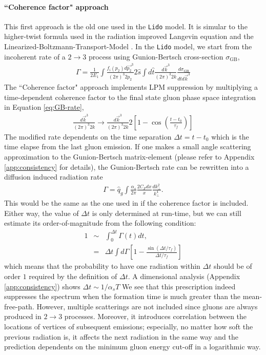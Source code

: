 \documentclass[aps, prc, reprint, amsmath, groupedaddress, nofootinbib]{revtex4-1}
\begin{document}
\paragraph*{``Coherence factor" approach} This first approach is the old one used in the {\tt Lido} model. 
It is simular to the higher-twist formula used in the radiation improved Langevin equation \cite{Cao:2013ita} and the Linearized-Boltzmann-Transport-Model \cite{Cao:2016gvr,Cao:2017hhk}.
In the {\tt Lido} model, we start from the incoherent rate of a $2\rightarrow 3$ process using Gunion-Bertsch cross-section $\sigma_\textrm{GB}$,
\begin{eqnarray}\label{eq:GB-rate}
\Gamma = \frac{1}{2E_1}\int\frac{f_i(p_2)d\vec{p_2}^3}{(2\pi)^3 2p_2}2\hat{s}\int d\hat{t}\frac{d\vec{k}^3}{(2\pi)^3 2k}\frac{d\sigma_{\textrm{GB}}}{d\hat{t}d\vec{k}^3}
\end{eqnarray}
The ``Coherence factor" approach implements LPM suppression by multiplying a time-dependent coherence factor to the final state gluon phase space integration in Equation \ref{eq:GB-rate},
\begin{eqnarray}\label{eq:GB-rate-LPM}
\frac{d\vec{k}^3}{(2\pi)^3 2k} \rightarrow \frac{d\vec{k}^3}{(2\pi)^3 2k} 2\left[1-\cos\left(\frac{t-t_0}{\tau_f}\right)\right]
\end{eqnarray}
The modified rate dependents on the time separation $\Delta t = t-t_0$ which is the time elapse from the last gluon emission.
If one makes a small angle scattering approximation to the Gunion-Bertsch matrix-element (please refer to Appendix \ref{app:consistency} for details), the Gunion-Bertsch rate can be rewritten into a diffusion induced radiation rate
\begin{eqnarray}\label{eq:GB-small-angle-rate}
\Gamma = \hat{q}_g\int\frac{\alpha_s}{2\pi}\frac{2C_F dx}{x} \frac{dk_\perp^2}{k_\perp^4}.
\end{eqnarray}
This would be the same as the one used in \cite{Cao:2013ita} if the coherence factor is included.
Either way, the value of $\Delta t$ is only determined at run-time,
but we can still estimate its order-of-magnitude from the following condition:
\begin{eqnarray}\label{eq:delta-t-1}
\nonumber
1 &\sim& \int_0^{\Delta t}\Gamma(t) dt,\\
&=& \Delta t \int d\Gamma \left[1-\frac{\sin(\Delta t/\tau_f)}{\Delta t/\tau_f}\right]
\end{eqnarray}
which means that the probability to have one radiation within $\Delta t$ should be of order $1$ required by the definition of $\Delta t$.
A dimensional analysis (Appendix \ref{app:consistency}) shows $\Delta t \sim 1/\alpha_s T$
We see that this prescription indeed suppresses the spectrum when the formation time is much greater than the mean-free-path. 
However, multiple scatterings are not included since gluons are always produced in $2\rightarrow3$ processes.
Moreover, it introduces correlation between the locations of vertices of subsequent emissions;
especially, no matter how soft the previous radiation is, it affects the next radiation in the same way and the prediction dependents on the minimum gluon energy cut-off in a logarithmic way.
\end{document}
